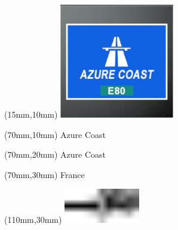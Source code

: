 \null\newpage
\begin{textblock*}{50mm}(15mm,10mm)%
\includegraphics[width=50mm]{LG/2015-05-20_00073.png}
\end{textblock*}
\begin{textblock*}{130mm}(70mm,10mm)%
{\fontsize{20}{20}\selectfont Azure Coast}\\
\end{textblock*}
\begin{textblock*}{120mm}(70mm,20mm)%
{\fontsize{16}{16}\selectfont Azure Coast}\\
\end{textblock*}
\begin{textblock*}{120mm}(70mm,30mm)%
{\fontsize{12}{12}\selectfont France}
\end{textblock*}
\begin{textblock*}{30mm}(110mm,30mm)%
\centering
\includegraphics[height=15mm]{icons/tofinish.pdf}
\end{textblock*}
